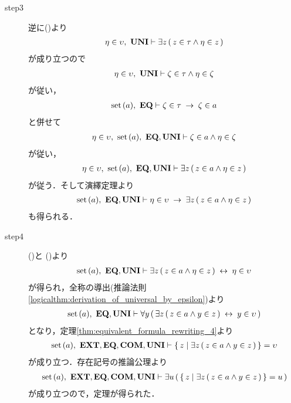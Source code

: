\begin{sketch}
\begin{description}
			\item[step3]
				逆に()より
				\begin{align}
					\eta \in \upsilon,\ \mbox{{\bf UNI}} \vdash
					\exists z\, (\, z \in \tau \wedge \eta \in z\, )
				\end{align}
				が成り立つので
				\begin{align}
					\eta \in \upsilon,\ \mbox{{\bf UNI}} \vdash
					\zeta \in \tau \wedge \eta \in \zeta
				\end{align}
				が従い，
				\begin{align}
					\operatorname*{set}\hspace{0.15em}(a),\ \mbox{{\bf EQ}} \vdash
					\zeta \in \tau \hspace{0.25em}\rightarrow\hspace{0.25em} \zeta \in a
				\end{align}
				と併せて
				\begin{align}
					\eta \in \upsilon,\ \operatorname*{set}\hspace{0.15em}(a),\ \mbox{{\bf EQ}},\mbox{{\bf UNI}} \vdash
					\zeta \in a \wedge \eta \in \zeta
				\end{align}
				が従い，
				\begin{align}
					\eta \in \upsilon,\ \operatorname*{set}\hspace{0.15em}(a),\ \mbox{{\bf EQ}},\mbox{{\bf UNI}} \vdash
					\exists z\, (\, z \in a \wedge \eta \in z\, )
				\end{align}
				が従う．そして演繹定理より
				\begin{align}
					\operatorname*{set}\hspace{0.15em}(a),\ \mbox{{\bf EQ}},\mbox{{\bf UNI}} \vdash
					\eta \in \upsilon \hspace{0.25em}\rightarrow\hspace{0.25em} \exists z\, (\, z \in a \wedge \eta \in z\, )
					\label{fom:union_of_a_set_is_a_set_3}
				\end{align}
				も得られる．
				
			\item[step4]
				()と
				()より
				\begin{align}
					\operatorname*{set}\hspace{0.15em}(a),\ \mbox{{\bf EQ}},\mbox{{\bf UNI}} \vdash
					\exists z\, (\, z \in a \wedge \eta \in z\, ) \hspace{0.25em}\leftrightarrow\hspace{0.25em} \eta \in \upsilon
				\end{align}
				が得られ，全称の導出(推論法則\ref{logicalthm:derivation_of_universal_by_epsilon})より
				\begin{align}
					\operatorname*{set}\hspace{0.15em}(a),\ \mbox{{\bf EQ}},\mbox{{\bf UNI}} \vdash
					\forall y\, (\, \exists z\, (\, z \in a \wedge y \in z\, ) \hspace{0.25em}\leftrightarrow\hspace{0.25em} y \in \upsilon\, )
				\end{align}
				となり，定理\ref{thm:equivalent_formula_rewriting_4}より
				\begin{align}
					\operatorname*{set}\hspace{0.15em}(a),\ \mbox{{\bf EXT}},\mbox{{\bf EQ}},\mbox{\bf COM},\mbox{{\bf UNI}} \vdash
					\{\, z \mid \exists z\, (\, z \in a \wedge y \in z\, )\, \} = \upsilon
				\end{align}
				が成り立つ．存在記号の推論公理より
				\begin{align}
					\operatorname*{set}\hspace{0.15em}(a),\ \mbox{{\bf EXT}},\mbox{{\bf EQ}},\mbox{\bf COM},\mbox{{\bf UNI}} \vdash
					\exists u\, (\, \{\, z \mid \exists z\, (\, z \in a \wedge y \in z\, )\, \} = u\, )
				\end{align}
				が成り立つので，定理が得られた．
				\QED
		\end{description}
	\end{sketch}
	
